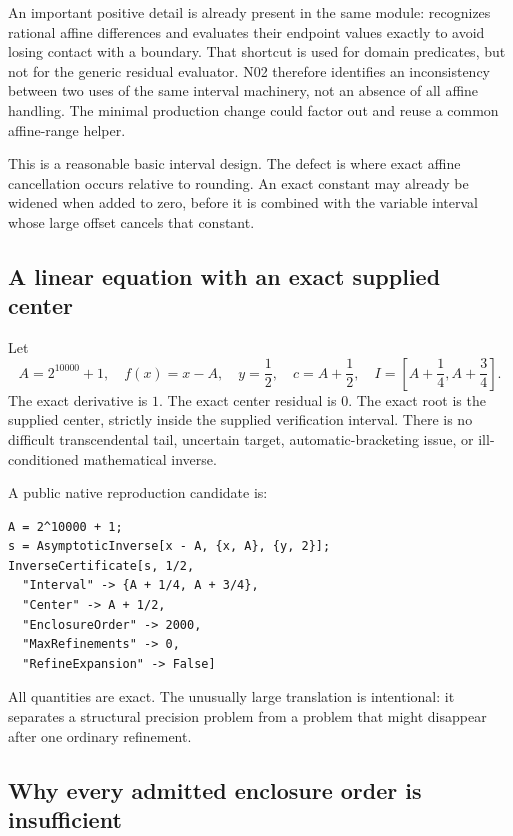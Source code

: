 \documentclass[11pt,a4paper]{article}
\newcommand{\code}[1]{\texttt{\detokenize{#1}}}
\begin{document}
An important positive detail is already present in the same module: \code{certPositiveCondition} recognizes rational affine differences and evaluates their endpoint values exactly to avoid losing contact with a boundary. That shortcut is used for domain predicates, but not for the generic residual \code{Plus} evaluator. N02 therefore identifies an inconsistency between two uses of the same interval machinery, not an absence of all affine handling. The minimal production change could factor out and reuse a common affine-range helper.\cite{certificates}

This is a reasonable basic interval design. The defect is where exact affine cancellation occurs relative to rounding. An exact constant may already be widened when added to zero, before it is combined with the variable interval whose large offset cancels that constant.

\subsection{A linear equation with an exact supplied center}

Let
\begin{equation}\label{eq:affine-witness}
 A=2^{10000}+1,\quad f(x)=x-A,\quad y=\frac12,
 \quad c=A+\frac12,
 \quad I=\left[A+\frac14,A+\frac34\right].
\end{equation}
The exact derivative is $1$. The exact center residual is $0$. The exact root is the supplied center, strictly inside the supplied verification interval. There is no difficult transcendental tail, uncertain target, automatic-bracketing issue, or ill-conditioned mathematical inverse.

A public native reproduction candidate is:
\begin{lstlisting}
A = 2^10000 + 1;
s = AsymptoticInverse[x - A, {x, A}, {y, 2}];
InverseCertificate[s, 1/2,
  "Interval" -> {A + 1/4, A + 3/4},
  "Center" -> A + 1/2,
  "EnclosureOrder" -> 2000,
  "MaxRefinements" -> 0,
  "RefineExpansion" -> False]
\end{lstlisting}
All quantities are exact. The unusually large translation is intentional: it separates a structural precision problem from a problem that might disappear after one ordinary refinement.

\subsection{Why every admitted enclosure order is insufficient}
\end{document}
